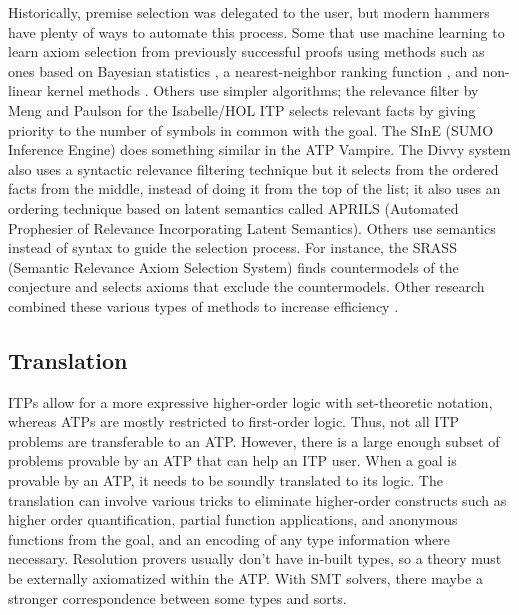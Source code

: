\documentclass{article}
\begin{document}
		Historically, premise selection was delegated to the 
		user, but modern hammers have plenty of ways to 
		automate this process. Some that use machine learning
		to learn axiom selection from previously successful 
		proofs using methods such as ones based on 
		Bayesian statistics \cite{DBLP:journals/jar/AlamaHKTU14}, 
		a nearest-neighbor ranking function 
		\cite{DBLP:conf/cade/KaliszykU13a}, and non-linear 
		kernel methods \cite{DBLP:journals/jar/AlamaHKTU14}.
		Others use simpler algorithms; the relevance filter 
		by Meng and Paulson 
		\cite{DBLP:journals/japll/MengP09}
		for the Isabelle/HOL ITP selects relevant facts by 
		giving priority to the number of symbols in common 
		with the goal. The SInE (SUMO Inference Engine) 
		\cite{10.1007/978-3-642-22438-6_23} does something 
		similar in the ATP Vampire. The Divvy system 
		\cite{10.1007/978-3-642-02959-2_13} also uses a 
		syntactic relevance filtering technique but it 
		selects from the ordered facts from the middle, 
		instead of doing it from the top of the list; it
		also uses an ordering technique based 
		on latent semantics called APRILS (Automated 
		Prophesier of Relevance Incorporating Latent Semantics).
		Others use semantics instead of syntax to guide
		the selection process. For instance, the SRASS 
		(Semantic Relevance Axiom Selection System) 
		\cite{10.1007/978-3-540-73595-3_20} finds 
		countermodels of the conjecture and selects axioms that
		exclude the countermodels. Other research combined
		these various types of methods to increase efficiency 
		\cite{DBLP:journals/corr/KaliszykU13b, 
			10.1007/978-3-642-31365-3_30}.
		
		\subsection{Translation}
		ITPs allow for a more expressive higher-order logic 
		with set-theoretic notation, whereas ATPs are mostly 
		restricted to first-order logic. Thus, not all 
		ITP problems are transferable to an ATP. However, 
		there is a large enough subset of problems provable
		by an ATP that can help an ITP user. When a goal is 
		provable by an ATP, it needs to be soundly translated 
		to its logic. The translation can involve various 
		tricks to eliminate higher-order constructs
		\cite{DBLP:journals/jar/MengP08} 
		such as higher order quantification, partial 
		function applications, and anonymous functions
		from the goal, and an encoding of any 
		type information where necessary. Resolution 
		provers usually don't have 
		in-built types, so a theory must be externally 
		axiomatized within the ATP. With SMT solvers, there
		maybe a stronger correspondence between some types and 
		sorts. 
	
\end{document}
